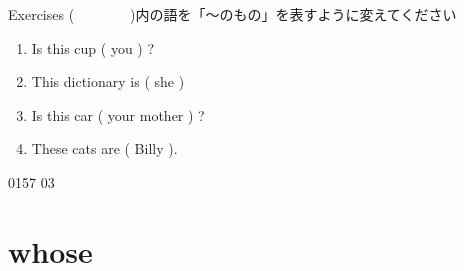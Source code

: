 \documentclass[aspectratio=169,xcolor={dvipsnames,table}]{beamer}
\begin{document}
\begin{frame}[plain]{Exercises}
(~~~~~~~~)内の語を「〜のもの」を表すように変えてください
 \begin{enumerate}
  \item Is this cup ( you ) ?\hfill{}
  \item This dictionary is ( she )\hfill{}
  \item Is this car ( your mother ) ?\hfill{}
  \item These cats are ( Billy ).\hfill{}
 \end{enumerate}

\hfill{\tiny 0157}\,{\scriptsize {}\,03}

\end{frame}
\section{whose }
\end{document}
